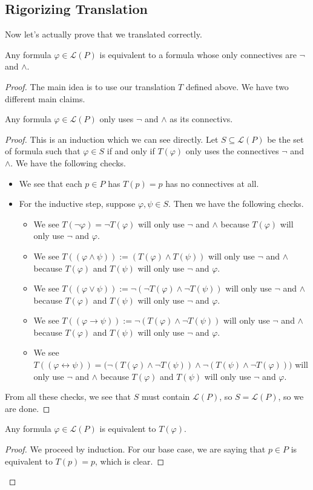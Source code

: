 \subsection{Rigorizing Translation}
Now let's actually prove that we translated correctly.
\begin{theorem}
	Any formula $\varphi\in\mathcal L(P)$ is equivalent to a formula whose only connectives are $\lnot$ and $\land$.
\end{theorem}
\begin{proof}
	The main idea is to use our translation $T$ defined above. We have two different main claims.
	\begin{lemma}
		Any formula $\varphi\in\mathcal L(P)$ only uses $\lnot$ and $\land$ as its connectivs.
	\end{lemma}
	\begin{proof}
		This is an induction which we can see directly. Let $S\subseteq\mathcal L(P)$ be the set of formula such that $\varphi\in S$ if and only if $T(\varphi)$ only uses the connectives $\lnot$ and $\land$. We have the following checks.
		\begin{itemize}
			\item We see that each $p\in P$ has $T(p)=p$ has no connectives at all.
			\item For the inductive step, suppose $\varphi,\psi\in S$. Then we have the following checks.
			\begin{itemize}
				\item We see $T(\lnot\varphi)=\lnot T(\varphi)$ will only use $\lnot$ and $\land$ because $T(\varphi)$ will only use $\lnot$ and $\varphi$.
				\item We see $T((\varphi\land\psi)):=(T(\varphi)\land T(\psi))$ will only use $\lnot$ and $\land$ because $T(\varphi)$ and $T(\psi)$ will only use $\lnot$ and $\varphi$.
				\item We see $T((\varphi\lor\psi)):=\lnot(\lnot T(\varphi)\land\lnot T(\psi))$ will only use $\lnot$ and $\land$ because $T(\varphi)$ and $T(\psi)$ will only use $\lnot$ and $\varphi$.
				\item We see $T((\varphi\to\psi)):=\lnot(T(\varphi)\land\lnot T(\psi))$ will only use $\lnot$ and $\land$ because $T(\varphi)$ and $T(\psi)$ will only use $\lnot$ and $\varphi$.
				\item We see $T((\varphi\leftrightarrow\psi))=\big(\lnot(T(\varphi)\land\lnot T(\psi))\land\lnot(T(\psi)\land\lnot T(\varphi))\big)$ will only use $\lnot$ and $\land$ because $T(\varphi)$ and $T(\psi)$ will only use $\lnot$ and $\varphi$.
			\end{itemize}
		\end{itemize}
		From all these checks, we see that $S$ must contain $\mathcal L(P)$, so $S=\mathcal L(P)$, so we are done.
	\end{proof}
	\begin{lemma}
		Any formula $\varphi\in\mathcal L(P)$ is equivalent to $T(\varphi)$.
	\end{lemma}
	\begin{proof}
		We proceed by induction. For our base case, we are saying that $p\in P$ is equivalent to $T(p)=p$, which is clear.


\end{proof}
\end{proof}
